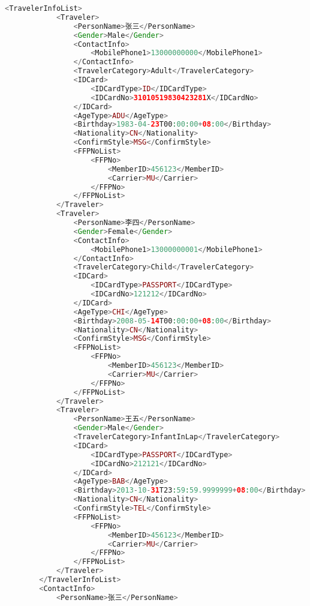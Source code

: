 \begin{lstlisting}[language=PHP]
        <TravelerInfoList>
            <Traveler>
                <PersonName>张三</PersonName>
                <Gender>Male</Gender>
                <ContactInfo>
                    <MobilePhone1>13000000000</MobilePhone1>
                </ContactInfo>
                <TravelerCategory>Adult</TravelerCategory>
                <IDCard>
                    <IDCardType>ID</IDCardType>
                    <IDCardNo>31010519830423281X</IDCardNo>
                </IDCard>
                <AgeType>ADU</AgeType>
                <Birthday>1983-04-23T00:00:00+08:00</Birthday>
                <Nationality>CN</Nationality>
                <ConfirmStyle>MSG</ConfirmStyle>
                <FFPNoList>
                    <FFPNo>
                        <MemberID>456123</MemberID>
                        <Carrier>MU</Carrier>
                    </FFPNo>
                </FFPNoList>
            </Traveler>
            <Traveler>
                <PersonName>李四</PersonName>
                <Gender>Female</Gender>
                <ContactInfo>
                    <MobilePhone1>13000000001</MobilePhone1>
                </ContactInfo>
                <TravelerCategory>Child</TravelerCategory>
                <IDCard>
                    <IDCardType>PASSPORT</IDCardType>
                    <IDCardNo>121212</IDCardNo>
                </IDCard>
                <AgeType>CHI</AgeType>
                <Birthday>2008-05-14T00:00:00+08:00</Birthday>
                <Nationality>CN</Nationality>
                <ConfirmStyle>MSG</ConfirmStyle>
                <FFPNoList>
                    <FFPNo>
                        <MemberID>456123</MemberID>
                        <Carrier>MU</Carrier>
                    </FFPNo>
                </FFPNoList>
            </Traveler>
            <Traveler>
                <PersonName>王五</PersonName>
                <Gender>Male</Gender>
                <TravelerCategory>InfantInLap</TravelerCategory>
                <IDCard>
                    <IDCardType>PASSPORT</IDCardType>
                    <IDCardNo>212121</IDCardNo>
                </IDCard>
                <AgeType>BAB</AgeType>
                <Birthday>2013-10-31T23:59:59.9999999+08:00</Birthday>
                <Nationality>CN</Nationality>
                <ConfirmStyle>TEL</ConfirmStyle>
                <FFPNoList>
                    <FFPNo>
                        <MemberID>456123</MemberID>
                        <Carrier>MU</Carrier>
                    </FFPNo>
                </FFPNoList>
            </Traveler>
        </TravelerInfoList>
        <ContactInfo>
            <PersonName>张三</PersonName>

\end{lstlisting}
